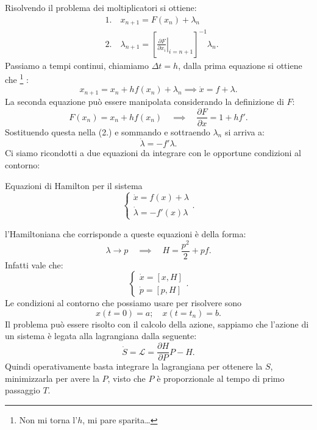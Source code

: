 Risolvendo il problema dei moltiplicatori si ottiene:
\[\begin{aligned}
    &1. \quad x_{n+1} = F(x_n) + \lambda_n\\
    &2. \quad \lambda_{n+1}=\left[\left.\frac{\partial F}{\partial x_i} \right|_{i = n+1}\right]^{-1}\lambda_n
.\end{aligned}\]
Passiamo a tempi continui, chiamiamo $\Delta t = h$, dalla prima equazione si ottiene che
\footnote{Non mi torna l'$h$, mi pare sparita\ldots}
:
\[
    x_{n+1} = x_n + h f(x_n) + \lambda_n \implies  \dot{x} = f + \lambda
.\] 
La seconda equazione può essere manipolata considerando la definizione di $F$:
\[
    F(x_n) = x_n+hf(x_n) \quad \implies  \quad  \frac{\partial F}{\partial x} = 1+hf'
.\] 
Sostituendo questa nella (2.) e sommando e sottraendo $\lambda_n$ si arriva a:
\[
    \dot{\lambda} =  - f'\lambda
.\] 
Ci siamo ricondotti a due equazioni da integrare con le opportune condizioni al contorno:
\begin{redbox}{Equazioni di Hamilton per il sistema}
\[
    \begin{cases}
	\dot{x} = f(x) + \lambda\\
	\dot{\lambda } = - f'(x) \lambda
    \end{cases}
.\]     
\end{redbox}
\noindent
l'Hamiltoniana che corrisponde a queste equazioni è della forma:
\[
    \lambda  \to p \quad \implies  \quad H = \frac{p^2}{2} + pf
.\] 
Infatti vale che:
\[
    \begin{cases}
	\dot{x} = \left[x,H\right]\\
	\dot{p} = \left[p,H\right]
    \end{cases}
.\] 
Le condizioni al contorno che possiamo usare per risolvere sono 
\[
    x(t=0) = a; \quad x(t = t_n) = b
.\] 
Il problema può essere risolto con il calcolo della azione, sappiamo che l'azione di un sistema è legata alla lagrangiana dalla seguente:
\[
    \dot{S} = \mathcal{L} = \frac{\partial H}{\partial P} P - H
.\] 
Quindi operativamente basta integrare la lagrangiana per ottenere la $S$, minimizzarla per avere la $P$, visto che $P$ è proporzionale al tempo di primo passaggio $T$. 
